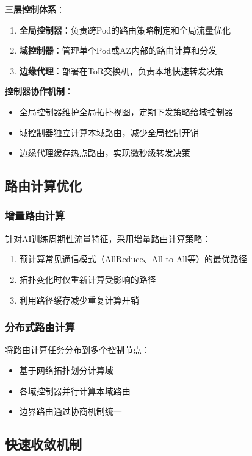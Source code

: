 \textbf{三层控制体系}：
\begin{enumerate}
    \item \textbf{全局控制器}：负责跨Pod的路由策略制定和全局流量优化
    \item \textbf{域控制器}：管理单个Pod或AZ内部的路由计算和分发
    \item \textbf{边缘代理}：部署在ToR交换机，负责本地快速转发决策
\end{enumerate}

\textbf{控制器协作机制}：
\begin{itemize}
    \item 全局控制器维护全局拓扑视图，定期下发策略给域控制器
    \item 域控制器独立计算本域路由，减少全局控制开销
    \item 边缘代理缓存热点路由，实现微秒级转发决策
\end{itemize}

\subsection{路由计算优化}

\subsubsection{增量路由计算}

针对AI训练周期性流量特征，采用增量路由计算策略：
\begin{enumerate}
    \item 预计算常见通信模式（AllReduce、All-to-All等）的最优路径
    \item 拓扑变化时仅重新计算受影响的路径
    \item 利用路径缓存减少重复计算开销
\end{enumerate}

\subsubsection{分布式路由计算}

将路由计算任务分布到多个控制节点：
\begin{itemize}
    \item 基于网络拓扑划分计算域
    \item 各域控制器并行计算本域路由
    \item 边界路由通过协商机制统一
\end{itemize}

\subsection{快速收敛机制}

